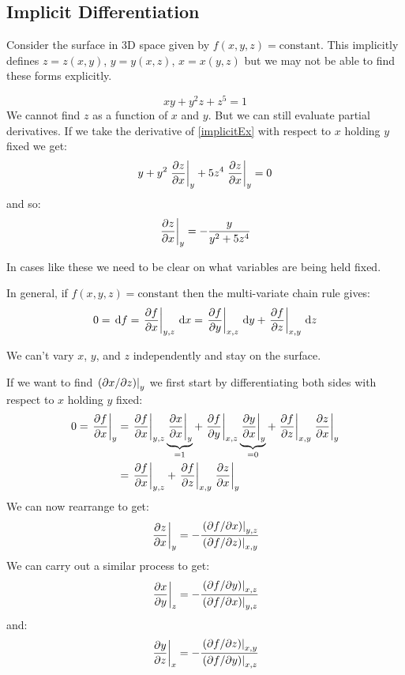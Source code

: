 \documentclass[../main.tex]{subfiles}
\begin{document}
\subsection{Implicit Differentiation}
Consider the surface in 3D space given by $f(x, y, z) = \text{constant}$.
This implicitly defines $z = z(x, y)$, $y = y(x, z)$, $x = x(y, z)$ but we may not be able to find these forms explicitly.
\begin{example}
\begin{equation}
  xy + y^2 z + z^5 = 1
  \label{implicitEx}
\end{equation}
We cannot find $z$ as a function of $x$ and $y$.
But we can still evaluate partial derivatives.
If we take the derivative of \cref{implicitEx} with respect to $x$ holding $y$ fixed we get:
\[
  y + y^2 \at{\pderiv{z}{x}}{y} + 5z^4 \at{\pderiv{z}{x}}{y} = 0
\]
and so:
\[
  \at{\pderiv{z}{x}}{y} = -\frac{y}{y^2 + 5z^4}
\]
\end{example}
\begin{remark}[Warning]
  In cases like these we need to be clear on what variables are being held fixed.
\end{remark}
In general, if $f(x, y, z) = \text{constant}$ then the multi-variate chain rule gives:
\[
  0 = \d{f} = \at{\pderiv{f}{x}}{y, z} \d{x} = \at{\pderiv{f}{y}}{x, z} \d{y} + \at{\pderiv{f}{z}}{x, y} \d{z}
\]
\begin{remark}[Warning]
We can't vary $x$, $y$, and $z$ independently and stay on the surface.
\end{remark}
If we want to find $\left. (\partial x/\partial z) \right|_{y}$ we first start by differentiating both sides with respect to $x$ holding $y$ fixed:
\begin{align*}
  0 = \at{\pderiv{f}{x}}{y} &= \at{\pderiv{f}{x}}{y,z} \underbrace{\at{\pderiv{x}{x}}{y}}_{=1} + \at{\pderiv{f}{y}}{x,z} \underbrace{\at{\pderiv{y}{x}}{y}}_{=0} + \at{\pderiv{f}{z}}{x, y} \at{\pderiv{z}{x}}{y} \\
                            &=\at{\pderiv{f}{x}}{y,z} + \at{\pderiv{f}{z}}{x, y} \at{\pderiv{z}{x}}{y} \\
\end{align*}
We can now rearrange to get:
\[
  \at{\pderiv{z}{x}}{y} = -\frac{\at{(\partial f/\partial x)}{y, z}}{\at{(\partial f/\partial z)}{x, y}}
\]
We can carry out a similar process to get:
\[
  \at{\pderiv{x}{y}}{z} = -\frac{\at{(\partial f/\partial y)}{x, z}}{\at{(\partial f/\partial x)}{y, z}}
\]
and:
\[
  \at{\pderiv{y}{z}}{x} = -\frac{\at{(\partial f/\partial z)}{x, y}}{\at{(\partial f/\partial y)}{x, z}}
\]
\end{document}
